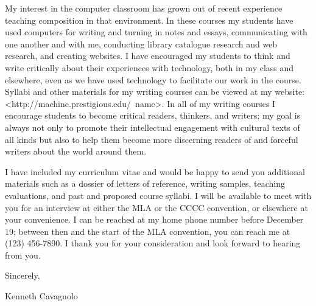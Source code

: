 \documentclass[11pt]{article}
\begin{document}
My interest in the computer classroom has grown out of recent
experience teaching composition in that environment.  In these courses
my students have used computers for writing and turning in notes and
essays, communicating with one another and with me, conducting library
catalogue research and web research, and creating websites. I have
encouraged my students to think and write critically about their
experiences with technology, both in my class and elsewhere, even as
we have used technology to facilitate our work in the course. Syllabi
and other materials for my writing courses can be viewed at my
website: <http://machine.prestigious.edu/~name>. In all of my writing
courses I encourage students to become critical readers, thinkers, and
writers; my goal is always not only to promote their intellectual
engagement with cultural texts of all kinds but also to help them
become more discerning readers of and forceful writers about the world
around them.

I have included my curriculum vitae and would be happy to send you
additional materials such as a dossier of letters of reference,
writing samples, teaching evaluations, and past and proposed course
syllabi. I will be available to meet with you for an interview at
either the MLA or the CCCC convention, or elsewhere at your
convenience. I can be reached at my home phone number before December
19; between then and the start of the MLA convention, you can reach me
at (123) 456-7890. I thank you for your consideration and look forward
to hearing from you.

Sincerely,\\
\begin{minipage}{7.5in}
\end{minipage}
Kenneth Cavagnolo
\end{document}
